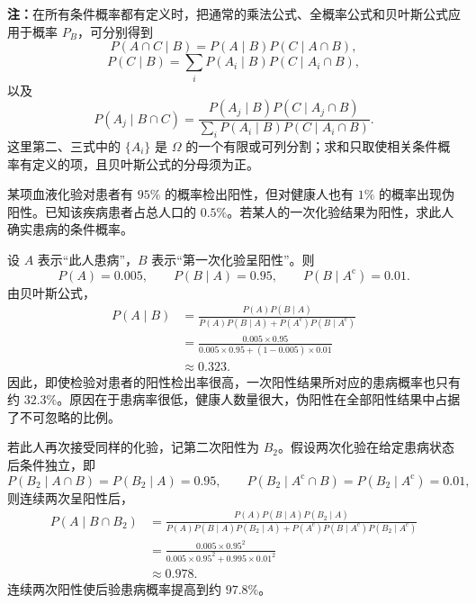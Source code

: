 \textbf{注：}\quad 在所有条件概率都有定义时，把通常的乘法公式、全概率公式和贝叶斯公式应用于概率 $P_B$，可分别得到
\[
P(A\cap C\mid B)
=P(A\mid B)P(C\mid A\cap B),
\]
\[
P(C\mid B)
=\sum_i P(A_i\mid B)P(C\mid A_i\cap B),
\]
以及
\[
P(A_j\mid B\cap C)
=\frac{P(A_j\mid B)P(C\mid A_j\cap B)}
{\displaystyle\sum_i P(A_i\mid B)P(C\mid A_i\cap B)}.
\]
这里第二、三式中的 $\{A_i\}$ 是 $\Omega$ 的一个有限或可列分割；求和只取使相关条件概率有定义的项，且贝叶斯公式的分母须为正。

\begin{example}[血液化验与重复检测]
某项血液化验对患者有 $95\%$ 的概率检出阳性，但对健康人也有 $1\%$ 的概率出现伪阳性。已知该疾病患者占总人口的 $0.5\%$。若某人的一次化验结果为阳性，求此人确实患病的条件概率。

设 $A$ 表示“此人患病”，$B$ 表示“第一次化验呈阳性”。则
\[
P(A)=0.005,
\qquad
P(B\mid A)=0.95,
\qquad
P(B\mid A^{\mathrm c})=0.01.
\]
由贝叶斯公式，
\[
\begin{aligned}
P(A\mid B)
&=\frac{P(A)P(B\mid A)}
{P(A)P(B\mid A)+P(A^{\mathrm c})P(B\mid A^{\mathrm c})}\\
&=\frac{0.005\times0.95}
{0.005\times0.95+(1-0.005)\times0.01}\\
&\approx0.323.
\end{aligned}
\]
因此，即使检验对患者的阳性检出率很高，一次阳性结果所对应的患病概率也只有约 $32.3\%$。原因在于患病率很低，健康人数量很大，伪阳性在全部阳性结果中占据了不可忽略的比例。

若此人再次接受同样的化验，记第二次阳性为 $B_2$。假设两次化验在给定患病状态后条件独立，即
\[
P(B_2\mid A\cap B)=P(B_2\mid A)=0.95,
\qquad
P(B_2\mid A^{\mathrm c}\cap B)=P(B_2\mid A^{\mathrm c})=0.01,
\]
则连续两次呈阳性后，
\[
\begin{aligned}
P(A\mid B\cap B_2)
&=\frac{P(A)P(B\mid A)P(B_2\mid A)}
{P(A)P(B\mid A)P(B_2\mid A)
+P(A^{\mathrm c})P(B\mid A^{\mathrm c})P(B_2\mid A^{\mathrm c})}\\
&=\frac{0.005\times0.95^2}
{0.005\times0.95^2+0.995\times0.01^2}\\
&\approx0.978.
\end{aligned}
\]
连续两次阳性使后验患病概率提高到约 $97.8\%$。
\end{example}

